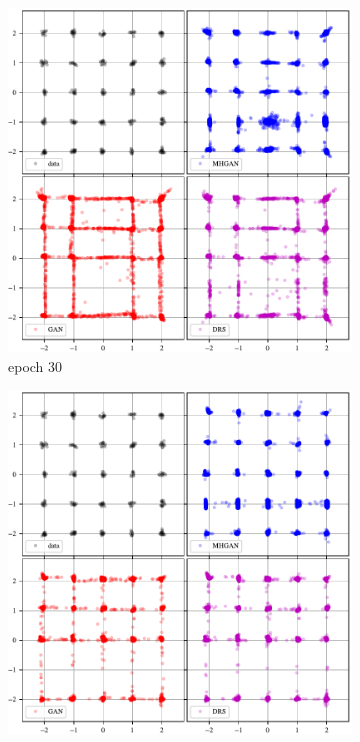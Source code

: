 \begin{figure}[htbp]
    \centering
    \begin{subfigure}[b]{0.49\textwidth}
       \centering
       \includegraphics[scale=0.5]{figures/mog_example_30.pdf}
       \caption{epoch 30}
    \end{subfigure}
    \hfill
    \begin{subfigure}[b]{0.49\textwidth}
       \centering
       \includegraphics[scale=0.5]{figures/mog_example_150.pdf}

\end{subfigure}
\end{figure}
